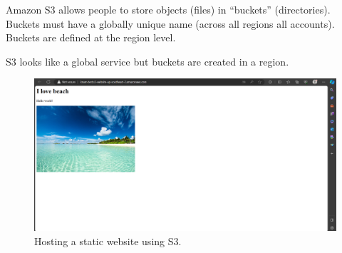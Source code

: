 \documentclass{article}
\begin{document}
Amazon S3 allows people to store objects (files) in “buckets” (directories). Buckets must have a globally unique name (across all regions all accounts). Buckets are defined at the region level.\par
S3 looks like a global service but buckets are created in a region.\par
\begin{figure}[h]
    \centering
    \includegraphics[width=13cm]{Pictures/Theory/Static Web S3.png}
    \caption{Hosting a static website using S3.}
    \label{fig:enter-label}
\end{figure}
\newpage
\end{document}
